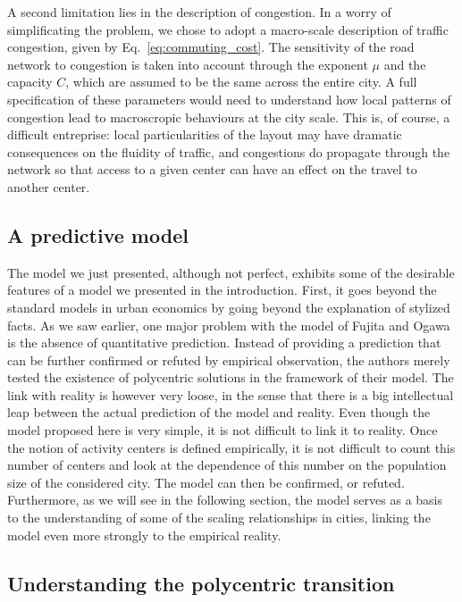 A second limitation lies in the description of congestion. In a worry of
simplificating the problem, we chose to adopt a macro-scale description of
traffic congestion, given by Eq.~\ref{eq:commuting_cost}. The sensitivity of the
road network to congestion is taken into account through the exponent $\mu$ and
the capacity $C$, which are assumed to be the same across the entire city. A
full specification of these parameters would need to understand how local
patterns of congestion lead to macroscropic behaviours at the city scale.  This
is, of course, a difficult entreprise:  local particularities of the layout may
have dramatic consequences on the fluidity of traffic, and congestions do
propagate through the network so that access to a given center can have an
effect on the travel to another center. 

\subsection{A predictive model}
\label{sub:a_predictive_mode}

The model we just presented, although not perfect, exhibits some of the
desirable features of a model we presented in the introduction. First, it goes
beyond the standard models in urban economics by going beyond the explanation of
stylized facts. As we saw earlier, one major problem with the model of Fujita
and Ogawa is the absence of quantitative prediction. Instead of providing a
prediction that can be further confirmed or refuted by empirical observation,
the authors merely tested the existence of polycentric solutions in the
framework of their model. The link with reality is however very loose, in the
sense that there is a big intellectual leap between the actual prediction of the
model and reality. Even though the model proposed here is very simple, it is not
difficult to link it to reality. Once the notion of activity centers is defined
empirically, it is not difficult to count this number of centers and look at the
dependence of this number on the population size of the considered city. The
model can then be confirmed, or refuted. Furthermore, as we will see in the
following section, the model serves as a basis to the understanding of some of
the scaling relationships in cities, linking the model even more strongly to the
empirical reality.

\subsection{Understanding the polycentric transition}
\label{sub:understanding_the_polycentric_tranistion}

